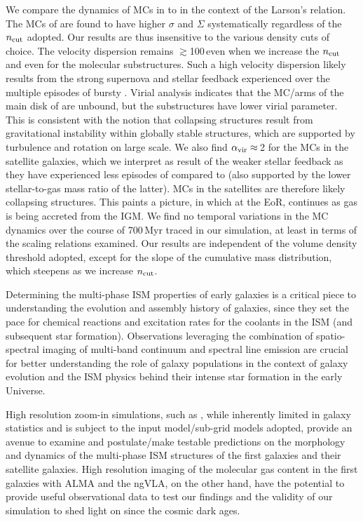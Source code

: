 \IfFileExists{emulateapjlegacy.cls}{\documentclass[iop]{emulateapjlegacy}}{\documentclass[iop]{emulateapj}}
\begin{document}
We compare the dynamics of MCs in \flower to \obs in the context of the Larson's relation.
The MCs of \flower are found to have higher $\sigma$ and $\Sigma$ systematically regardless of the $n_{\rm cut}$ adopted.
Our results are thus insensitive to the various density cuts of choice.
The velocity dispersion remains $\gtrsim$100\,\kms even when we increase the $n_{\rm cut}$ and even for  
the molecular substructures.
Such a high velocity dispersion likely results from 
the strong supernova and stellar feedback \flower experienced over the multiple episodes of bursty \SF.
Virial analysis indicates that the MC/arms of the main disk of \flower are unbound, but the substructures have lower virial parameter. 
This is consistent with the notion that collapsing structures result from gravitational instability within globally stable structures, which are 
supported by turbulence and rotation on large scale.
We also find $\alpha_{\rm vir}\approx$\,2 for the MCs in the satellite galaxies, which we interpret as 
result of the weaker stellar feedback as they have
experienced less episodes of \SF compared to \flower (also supported by the lower stellar-to-gas mass ratio of the latter).
MCs in the satellites are therefore likely collapsing structures. This paints a picture, in which at the EoR, \SF continues 
as gas is being accreted from the IGM.
We find no temporal variations in the MC dynamics over the course of 700\,Myr traced in our simulation, at least in terms of the scaling relations examined. 
Our results are independent of the volume density threshold adopted, except for the slope of the cumulative 
mass distribution, which steepens as we increase $n_{\rm cut}$. 

Determining the multi-phase ISM properties of early galaxies
is a critical piece to understanding the evolution and
assembly history of galaxies, since they set the pace
for chemical reactions and excitation rates for the coolants in the ISM (and subsequent star formation).
Observations leveraging the combination of spatio-spectral imaging of
multi-band continuum and spectral line emission are crucial for better understanding
the role of \highz galaxy populations
in the context of galaxy evolution and the ISM physics behind their intense star formation in the early Universe.

High resolution zoom-in simulations, such as , while inherently limited in galaxy
statistics and is subject to the input model/sub-grid models adopted, 
provide an avenue to examine and postulate/make testable predictions on the morphology and dynamics of
the multi-phase ISM structures of the first galaxies and their satellite galaxies.
High resolution imaging of the molecular gas content in the first galaxies with ALMA and the ngVLA, on the other hand,
have the potential to provide useful observational data to test our findings and the validity of our simulation to shed
light on \SF since the cosmic dark ages.
\end{document}
